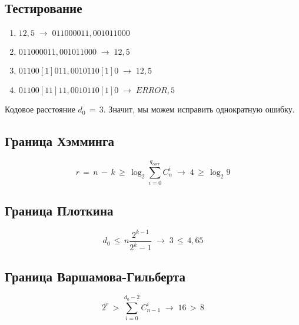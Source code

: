\documentclass[oneside, final, 12pt]{extarticle}
\begin{document}
\subsection*{Тестирование}
\begin{enumerate}
	\item \(12,5\;\rightarrow\;011000011,001011000\)
	\item \(011000011,001011000\;\rightarrow\;12,5\)
	\item \(01100[1]011,0010110[1]0\;\rightarrow\;12,5\)
	\item \(01100[11]11,0010110[1]0\;\rightarrow\;ERROR,5\)
\end{enumerate}

Кодовое расстояние \(d_0\,=\,3\). Значит, мы можем исправить однократную ошибку.

\subsection*{Граница Хэмминга}
\[r\,=\,n\,-\,k\,\geqslant\,\log_2\sum_{i=0}^{q_{corr}} C_n^i\;\rightarrow\;4\,\geqslant\,\log_2 9\]

\subsection*{Граница Плоткина}
\[d_0\,\leqslant\,n\frac{2^{k-1}}{2^k-1}\;\rightarrow\;3\,\leqslant\,4,65\]

\subsection*{Граница Варшамова-Гильберта}
\[2^r\,>\,\sum_{i=0}^{d_0-2}C_{n-1}^i\;\rightarrow\;16\,>\,8\]
\end{document}
